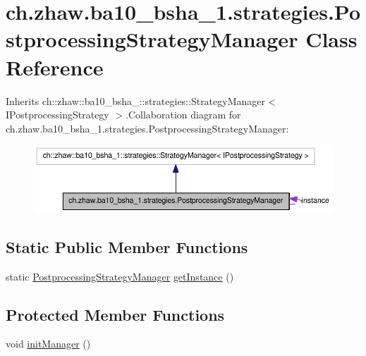 \hypertarget{classch_1_1zhaw_1_1ba10__bsha__1_1_1strategies_1_1PostprocessingStrategyManager}{
\section{ch.zhaw.ba10\_\-bsha\_\-1.strategies.PostprocessingStrategyManager Class Reference}
\label{classch_1_1zhaw_1_1ba10__bsha__1_1_1strategies_1_1PostprocessingStrategyManager}
}


Inherits ch::zhaw::ba10\_\-bsha\_::strategies::StrategyManager$<$ IPostprocessingStrategy $>$.Collaboration diagram for ch.zhaw.ba10\_\-bsha\_\-1.strategies.PostprocessingStrategyManager:\nopagebreak
\begin{figure}[H]
\begin{center}
\leavevmode
\includegraphics[width=400pt]{classch_1_1zhaw_1_1ba10__bsha__1_1_1strategies_1_1PostprocessingStrategyManager__coll__graph}
\end{center}
\end{figure}
\subsection*{Static Public Member Functions}
\begin{DoxyCompactItemize}
\item 
static \hyperlink{classch_1_1zhaw_1_1ba10__bsha__1_1_1strategies_1_1PostprocessingStrategyManager}{PostprocessingStrategyManager} \hyperlink{classch_1_1zhaw_1_1ba10__bsha__1_1_1strategies_1_1PostprocessingStrategyManager_a3c81006dedcd5201183eefdcc9c84b45}{getInstance} ()
\end{DoxyCompactItemize}
\subsection*{Protected Member Functions}
\begin{DoxyCompactItemize}
\item 
void \hyperlink{classch_1_1zhaw_1_1ba10__bsha__1_1_1strategies_1_1PostprocessingStrategyManager_aff24c51c23f269fd1d9a09416b09ce06}{initManager} ()
\end{DoxyCompactItemize}
